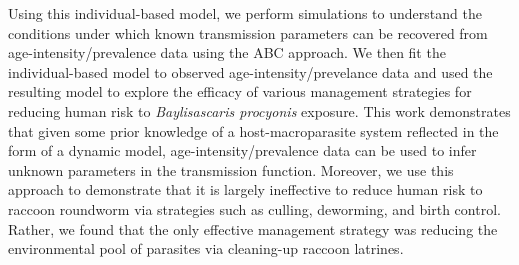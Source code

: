 \documentclass[11pt]{article}
\begin{document}
Using this individual-based model, we perform simulations to understand the conditions under which known transmission parameters can be recovered from age-intensity/prevalence data using the ABC approach.  We then fit the individual-based model to observed age-intensity/prevelance data and used the resulting model to explore the efficacy of various management strategies for reducing human risk to \emph{Baylisascaris procyonis} exposure. This work demonstrates that given some prior knowledge of a host-macroparasite system reflected in the form of a dynamic model, age-intensity/prevalence data can be used to infer unknown parameters in the transmission function. Moreover, we use this approach to demonstrate that it is largely ineffective to reduce human risk to raccoon roundworm via strategies such as culling, deworming, and birth control. Rather, we found that the only effective management strategy was reducing the environmental pool of parasites via cleaning-up raccoon latrines. 




\end{document}
